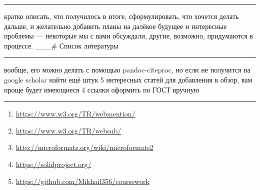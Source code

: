 \begin{center}\rule{0.5\linewidth}{0.5pt}\end{center}

кратко описать, что получилось в итоге, сформулировать, что хочется
делать дальше, и желательно добавить планы на далёкое будущее и
интересные проблемы --- некоторые мы с вами обсуждали, другие, возможно,
придумаются в процессе. \_\_\_\# Список литературы

\begin{center}\rule{0.5\linewidth}{0.5pt}\end{center}

вообще, его можно делать с помощью pandoc-citeproc, но если не получится
на google scholar найти ещё штук 5 интересных статей для добавления в
обзор, вам проще будет имеющиеся 4 ссылки оформить по ГОСТ вручную

\begin{center}\rule{0.5\linewidth}{0.5pt}\end{center}

\begin{enumerate}
\def\labelenumi{\arabic{enumi}.}
\tightlist
\item
  \url{https://www.w3.org/TR/webmention/}
\item
  \url{https://www.w3.org/TR/websub/}
\item
  \url{http://microformats.org/wiki/microformats2}
\item
  \url{https://solidproject.org/}
\item
  \url{https://github.com/Mikhail356/coursework}
\end{enumerate}
